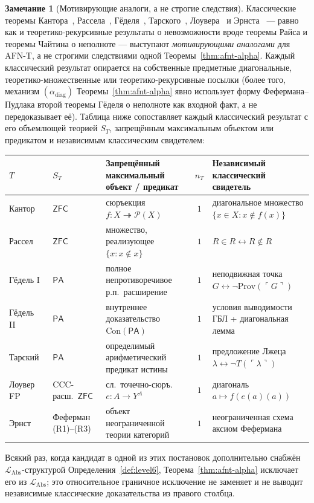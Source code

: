 \documentclass[11pt]{article}
\theoremstyle{plain}
\theoremstyle{definition}
\newtheorem{remark}[theorem]{Замечание}
\newcommand{\cP}{\mathcal{P}}
\newcommand{\LAbs}{\mathcal{L}_{\mathrm{Abs}}}
\newcommand{\Con}{\mathrm{Con}}
\newcommand{\ZFC}{\mathsf{ZFC}}
\begin{document}
\begin{remark}[Мотивирующие аналоги, а не строгие следствия]\label{thm:subsumption}
Классические теоремы Кантора~\cite{Cantor1891}, Рассела~\cite{Russell1903}, Гёделя~\cite{Godel1931}, Тарского~\cite{Tarski1936}, Лоувера~\cite{Lawvere1969} и Эрнста~\cite{Ernst2015} --- равно как и теоретико-рекурсивные результаты о невозможности вроде теоремы Райса и теоремы Чайтина о неполноте --- выступают \emph{мотивирующими аналогами} для AFN-T, а не строгими следствиями одной Теоремы~\ref{thm:afnt-alpha}. Каждый классический результат опирается на собственные предметные диагональные, теоретико-множественные или теоретико-рекурсивные посылки (более того, механизм $(\alpha_{\mathrm{diag}})$ Теоремы~\ref{thm:afnt-alpha} явно использует форму Фефермана--Пудлака второй теоремы Гёделя о неполноте как входной факт, а не передоказывает её). Таблица ниже сопоставляет каждый классический результат с его объемлющей теорией $S_T$, запрещённым максимальным объектом или предикатом и независимым классическим свидетелем:
\begin{center}\footnotesize
\begin{tabular}{@{}p{2.0cm} p{2.2cm} p{4.2cm} c p{4.6cm}@{}}
\toprule
$T$ & $S_T$ & Запрещённый максимальный объект / предикат & $n_T$ & Независимый классический свидетель \\ \midrule
Кантор~\cite{Cantor1891} & $\ZFC$ & сюръекция $f : X \twoheadrightarrow \cP(X)$ & $1$ & диагональное множество $\{x \in X : x \notin f(x)\}$ \\
Рассел~\cite{Russell1903} & $\ZFC$ & множество, реализующее $\{x : x \notin x\}$ & $1$ & $R \in R \leftrightarrow R \notin R$ \\
Гёдель I~\cite{Godel1931} & $\mathsf{PA}$ & полное непротиворечивое р.п.\ расширение & $1$ & неподвижная точка $G \leftrightarrow \neg \mathrm{Prov}(\ulcorner G \urcorner)$ \\
Гёдель II~\cite{Godel1931} & $\mathsf{PA}$ & внутреннее доказательство $\Con(\mathsf{PA})$ & $1$ & условия выводимости ГБЛ + диагональная лемма \\
Тарский~\cite{Tarski1936} & $\mathsf{PA}$ & определимый арифметический предикат истины & $1$ & предложение Лжеца $\lambda \leftrightarrow \neg T(\ulcorner \lambda \urcorner)$ \\
Лоувер FP~\cite{Lawvere1969} & CCC-расш.\ $\ZFC$ & сл.\ точечно-сюръ.\ $e : A \to Y^A$ & $1$ & диагональ $a \mapsto f(e(a)(a))$ \\
Эрнст~\cite{Ernst2015} & Феферман (R1)--(R3) & объект неограниченной теории категорий & $1$ & неограниченная схема аксиом Фефермана \\
\bottomrule
\end{tabular}
\end{center}
Всякий раз, когда кандидат в одной из этих постановок дополнительно снабжён $\LAbs$-структурой Определения~\ref{def:level6}, Теорема~\ref{thm:afnt-alpha} исключает его из $\LAbs$; это относительное граничное исключение не заменяет и не выводит независимые классические доказательства из правого столбца.
\end{remark}
\end{document}
